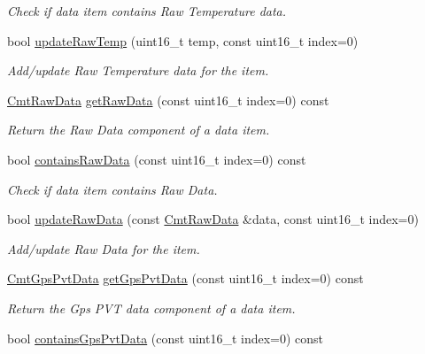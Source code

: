 \begin{DoxyCompactItemize}
\begin{DoxyCompactList}\small\item\em \-Check if data item contains \-Raw \-Temperature data. \end{DoxyCompactList}\item 
\hypertarget{classxsens_1_1Packet_a6507a746562b7e4c986e1ad4034dd78e}{bool \hyperlink{classxsens_1_1Packet_a6507a746562b7e4c986e1ad4034dd78e}{update\-Raw\-Temp} (uint16\-\_\-t temp, const uint16\-\_\-t index=0)}\label{classxsens_1_1Packet_a6507a746562b7e4c986e1ad4034dd78e}

\begin{DoxyCompactList}\small\item\em \-Add/update \-Raw \-Temperature data for the item. \end{DoxyCompactList}\item 
\hyperlink{structCmtRawData}{\-Cmt\-Raw\-Data} \hyperlink{classxsens_1_1Packet_a853d223a8aa2898186c4bd026a52fc85}{get\-Raw\-Data} (const uint16\-\_\-t index=0) const 
\begin{DoxyCompactList}\small\item\em \-Return the \-Raw \-Data component of a data item. \end{DoxyCompactList}\item 
\hypertarget{classxsens_1_1Packet_a305f2a9da8df614f8c19f980251e5734}{bool \hyperlink{classxsens_1_1Packet_a305f2a9da8df614f8c19f980251e5734}{contains\-Raw\-Data} (const uint16\-\_\-t index=0) const }\label{classxsens_1_1Packet_a305f2a9da8df614f8c19f980251e5734}

\begin{DoxyCompactList}\small\item\em \-Check if data item contains \-Raw \-Data. \end{DoxyCompactList}\item 
\hypertarget{classxsens_1_1Packet_abef58d63dde8cdea15bb45bdd9ab53ba}{bool \hyperlink{classxsens_1_1Packet_abef58d63dde8cdea15bb45bdd9ab53ba}{update\-Raw\-Data} (const \hyperlink{structCmtRawData}{\-Cmt\-Raw\-Data} \&data, const uint16\-\_\-t index=0)}\label{classxsens_1_1Packet_abef58d63dde8cdea15bb45bdd9ab53ba}

\begin{DoxyCompactList}\small\item\em \-Add/update \-Raw \-Data for the item. \end{DoxyCompactList}\item 
\hyperlink{structCmtGpsPvtData}{\-Cmt\-Gps\-Pvt\-Data} \hyperlink{classxsens_1_1Packet_a203f5cf9f0c75c519f27d910d9d2d188}{get\-Gps\-Pvt\-Data} (const uint16\-\_\-t index=0) const 
\begin{DoxyCompactList}\small\item\em \-Return the \-Gps \-P\-V\-T data component of a data item. \end{DoxyCompactList}\item 
\hypertarget{classxsens_1_1Packet_ada0b3271160a518de1a42c0295db0ff4}{bool \hyperlink{classxsens_1_1Packet_ada0b3271160a518de1a42c0295db0ff4}{contains\-Gps\-Pvt\-Data} (const uint16\-\_\-t index=0) const }\label{classxsens_1_1Packet_ada0b3271160a518de1a42c0295db0ff4}


\end{DoxyCompactItemize}
